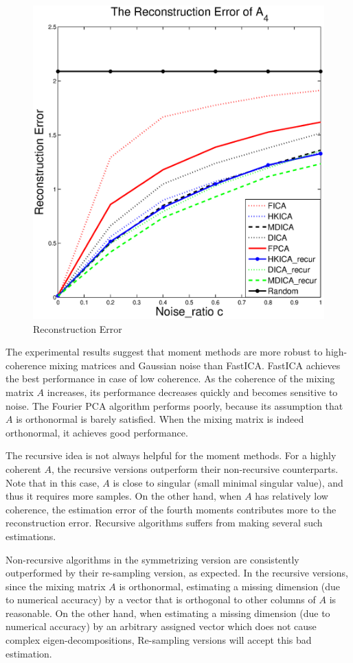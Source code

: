 \documentclass[jmlr]{article}
\theoremstyle{definition}
\begin{document}
\begin{figure}[t]
	\includegraphics[width =0.49\columnwidth]{error4}
\vspace{-0.5cm}
\caption{
\label{fig:Error}
 Reconstruction Error}
\end{figure}
The experimental results suggest that moment methods are more robust
to high-coherence mixing matrices and Gaussian noise than FastICA.
FastICA achieves the best performance in case of low coherence.
As the coherence of the mixing matrix $A$ increases, its performance decreases quickly and becomes sensitive to noise. 
The Fourier PCA algorithm performs poorly, because its assumption that
$A$ is orthonormal is barely satisfied. 
When the mixing matrix is indeed orthonormal, it achieves good performance.

The recursive idea is not always helpful for the moment methods. For a highly coherent $A$, the recursive versions outperform their non-recursive counterparts.
Note that in this case, $A$ is close to singular (small minimal
singular value), and thus it requires more samples.
On the other hand, when $A$ has relatively low coherence,  the estimation error of the fourth moments contributes more to the reconstruction error. 
Recursive algorithms suffers from making several such estimations.

Non-recursive algorithms in the symmetrizing version are consistently outperformed by their re-sampling version, as expected. 
In the recursive versions, since the mixing matrix $A$ is orthonormal, estimating a missing dimension (due to numerical accuracy) by a vector that is orthogonal to other columns of $A$ is reasonable. 
On the other hand, when estimating a missing dimension (due to numerical accuracy) by an arbitrary assigned vector which does not cause complex eigen-decompositions, Re-sampling versions will accept this bad estimation.
\fi
\end{document}
